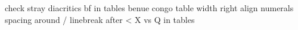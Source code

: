 check stray diacritics  
bf in tables
benue congo table width 
right align numerals 
spacing around /
linebreak after <
X vs Q in tables
    